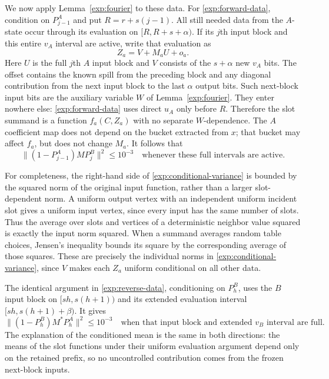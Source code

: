 We now apply Lemma~\ref{exp:fourier} to these data. For
\eqref{exp:forward-data}, condition on $P_{j-1}^A$ and put
$R=r+s(j-1)$. All still needed data from the $A$-state occur through
its evaluation on $[R,R+s+\alpha)$. If its $j$th input block and
this entire $v_A$ interval are active, write that evaluation as
\[
 Z_a=V+M_aU+o_a.
\]
Here $U$ is the full $j$th $A$ input block and $V$ consists of the
$s+\alpha$ new $v_A$ bits. The offset contains the known spill from
the preceding block and any diagonal contribution from the next
input block to the last $\alpha$ output bits. Such next-block input
bits are the auxiliary variable $W$ of Lemma~\ref{exp:fourier}.
They enter nowhere else: \eqref{exp:forward-data} uses direct
$u_A$ only before $R$. Therefore the slot summand is a function
$f_a(C,Z_a)$ with no separate $W$-dependence. The $A$ coefficient
map does not depend on the bucket extracted from $x$; that bucket
may affect $f_a$, but does not change $M_a$. It follows that
\begin{equation}
 \|(1-P_{j-1}^A)MP_j^B\|^2\leq10^{-3}
 \quad\text{whenever these full intervals are active.}
 \label{exp:forward-variance}
\end{equation}

For completeness, the right-hand side of
\eqref{exp:conditional-variance} is bounded by the squared norm of
the original input function, rather than a larger slot-dependent
norm. A uniform output vertex with an independent uniform incident
slot gives a uniform input vertex, since every input has the same
number of slots. Thus the average over slots and vertices of a
deterministic neighbor value squared is exactly the input norm
squared. When a summand averages random table choices, Jensen's
inequality bounds its square by the corresponding average of those
squares. These are precisely the individual norms in
\eqref{exp:conditional-variance}, since $V$ makes each $Z_a$ uniform
conditional on all other data.

The identical argument in \eqref{exp:reverse-data}, conditioning
on $P_h^B$, uses the $B$ input block on $[sh,s(h+1))$ and its
extended evaluation interval $[sh,s(h+1)+\beta)$. It gives
\begin{equation}
 \|(1-P_h^B)M^*P_h^A\|^2\leq10^{-3}
 \quad\text{when that input block and extended $v_B$ interval are full.}
 \label{exp:reverse-variance}
\end{equation}
The explanation of the conditioned mean is the same in both
directions: the means of the slot functions under their uniform
evaluation argument depend only on the retained prefix, so no
uncontrolled contribution comes from the frozen next-block inputs.


